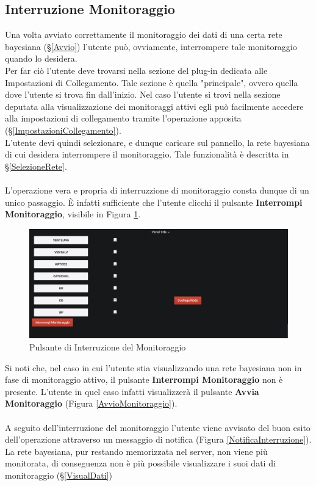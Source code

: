 \subsection{Interruzione Monitoraggio}\label{Interruzione}

Una volta avviato correttamente il monitoraggio dei dati di una certa rete bayesiana (§\ref{Avvio}) l'utente può, ovviamente, interrompere tale monitoraggio quando lo desidera.\\
Per far ciò l'utente deve trovarsi nella sezione del plug-in dedicata alle Impostazioni di Collegamento. Tale sezione è quella "principale", ovvero quella dove l'utente si trova fin dall'inizio. Nel caso l'utente si trovi nella sezione deputata alla visualizzazione dei monitoraggi attivi egli può facilmente accedere alla impostazioni di collegamento tramite l'operazione apposita (§\ref{ImpostazioniCollegamento}).\\
L'utente devi quindi selezionare, e dunque caricare sul pannello, la rete bayesiana di cui desidera interrompere il monitoraggio. Tale funzionalità è descritta in §\ref{SelezioneRete}.\\
~\\
L'operazione vera e propria di interruzzione di monitoraggio consta dunque di un unico passaggio. È infatti sufficiente che l'utente clicchi il pulsante \textbf{Interrompi Monitoraggio}, visibile in Figura \ref{InterruzioneMonitoraggio}.

\begin{figure}[H]
	\begin{center}
		\includegraphics[scale=0.4]{./images/InterruzioneMonitoraggio.png}
		 \caption{Pulsante di Interruzione del Monitoraggio}	
		 \label{InterruzioneMonitoraggio}
	\end{center}
\end{figure}

Si noti che, nel caso in cui l'utente stia visualizzando una rete bayesiana non in fase di monitoraggio attivo, il pulsante \textbf{Interrompi Monitoraggio} non è presente. L'utente in quel caso infatti visualizzerà il pulsante \textbf{Avvia Monitoraggio} (Figura \ref{AvvioMonitoraggio}).\\
~\\
A seguito dell'interruzione del monitoraggio l'utente viene avvisato del buon esito dell'operazione attraverso un messaggio di notifica (Figura \ref{NotificaInterruzione}). La rete bayesiana, pur restando memorizzata nel server, non viene più monitorata, di conseguenza non è più possibile visualizzare i suoi dati di monitoraggio (§\ref{VisualDati})


